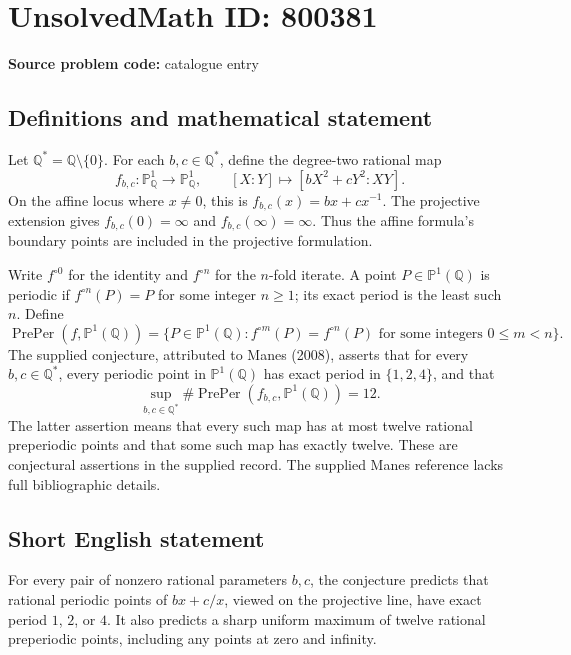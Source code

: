 \documentclass[11pt]{article}
\newcommand{\Q}{\mathbb{Q}}
\newcommand{\PP}{\mathbb{P}}
\begin{document}
\section*{UnsolvedMath ID: 800381}
\textbf{Source problem code:} catalogue entry
\subsection{Definitions and mathematical statement}
Let \(\Q^*=\Q\setminus\{0\}\). For each \(b,c\in\Q^*\), define the degree-two rational map
\[
f_{b,c}\colon\PP^1_{\Q}\longrightarrow\PP^1_{\Q},\qquad [X:Y]\longmapsto[bX^2+cY^2:XY].
\]
On the affine locus where \(x\ne0\), this is \(f_{b,c}(x)=bx+cx^{-1}\). The projective extension gives \(f_{b,c}(0)=\infty\) and \(f_{b,c}(\infty)=\infty\). Thus the affine formula's boundary points are included in the projective formulation.

Write \(f^{\circ0}\) for the identity and \(f^{\circ n}\) for the \(n\)-fold iterate. A point \(P\in\PP^1(\Q)\) is periodic if \(f^{\circ n}(P)=P\) for some integer \(n\ge1\); its exact period is the least such \(n\). Define
\[
\operatorname{PrePer}(f,\PP^1(\Q))
=\{P\in\PP^1(\Q): f^{\circ m}(P)=f^{\circ n}(P)\text{ for some integers }0\le m<n\}.
\]
The supplied conjecture, attributed to Manes (2008), asserts that for every \(b,c\in\Q^*\), every periodic point in \(\PP^1(\Q)\) has exact period in \(\{1,2,4\}\), and that
\[
\sup_{b,c\in\Q^*}\#\operatorname{PrePer}(f_{b,c},\PP^1(\Q))=12.
\]
The latter assertion means that every such map has at most twelve rational preperiodic points and that some such map has exactly twelve. These are conjectural assertions in the supplied record. The supplied Manes reference lacks full bibliographic details.
\subsection{Short English statement}
For every pair of nonzero rational parameters \(b,c\), the conjecture predicts that rational periodic points of \(bx+c/x\), viewed on the projective line, have exact period \(1\), \(2\), or \(4\). It also predicts a sharp uniform maximum of twelve rational preperiodic points, including any points at zero and infinity.
\end{document}
